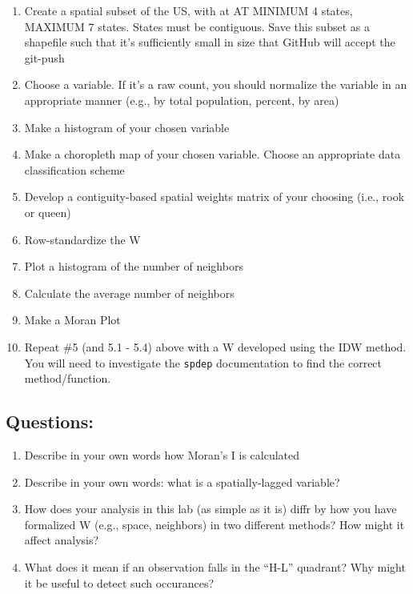 \documentclass[]{article}
\begin{document}
\begin{enumerate}
\def\labelenumi{\arabic{enumi}.}
\item
  Create a spatial subset of the US, with at AT MINIMUM 4 states,
  MAXIMUM 7 states. States must be contiguous. Save this subset as a
  shapefile such that it's sufficiently small in size that GitHub will
  accept the git-push
\item
  Choose a variable. If it's a raw count, you should normalize the
  variable in an appropriate manner (e.g., by total population, percent,
  by area)
\item
  Make a histogram of your chosen variable
\item
  Make a choropleth map of your chosen variable. Choose an appropriate
  data classiﬁcation scheme
\item
  Develop a contiguity-based spatial weights matrix of your choosing
  (i.e., rook or queen)
\item
  Row-standardize the W
\item
  Plot a histogram of the number of neighbors
\item
  Calculate the average number of neighbors
\item
  Make a Moran Plot
\item
  Repeat \#5 (and 5.1 - 5.4) above with a W developed using the IDW
  method. You will need to investigate the \texttt{spdep} documentation
  to find the correct method/function.
\end{enumerate}

\hypertarget{questions}{%
\subsection{Questions:}\label{questions}}

\begin{enumerate}
\def\labelenumi{\arabic{enumi}.}
\item
  Describe in your own words how Moran's I is calculated
\item
  Describe in your own words: what is a spatially-lagged variable?
\item
  How does your analysis in this lab (as simple as it is) diffr by how
  you have formalized W (e.g., space, neighbors) in two diﬀerent
  methods? How might it affect analysis?
\item
  What does it mean if an observation falls in the ``H-L'' quadrant? Why
  might it be useful to detect such occurances?
\end{enumerate}
\end{document}
